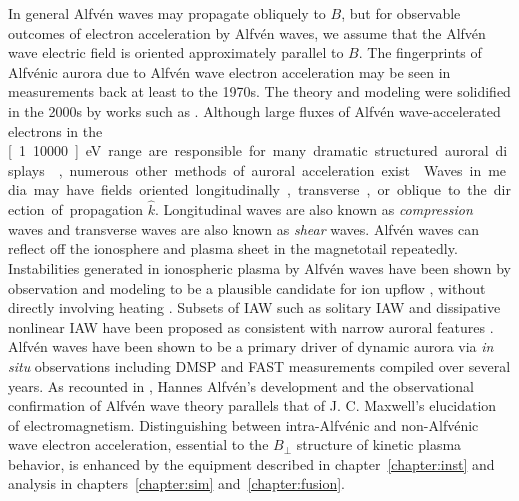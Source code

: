 In general Alfvén waves may propagate obliquely to $B$, but for observable outcomes of electron acceleration by Alfvén waves, we assume that the Alfvén wave electric field is oriented approximately parallel to $B$.
The fingerprints of Alfvénic aurora due to Alfvén wave electron acceleration may be seen in measurements back at least to the 1970s.
The theory and modeling were solidified in the 2000s by works such as \citet{stasiewicz2000,chaston2003,chaston2007how}.
Although large fluxes of Alfvén wave-accelerated electrons in the \unit[1..10000]{eV} range are responsible for many dramatic structured auroral displays \citep{chaston2003}, numerous other methods of auroral acceleration exist \citep{borovsky1993}.

Waves in media may have fields oriented longitudinally, transverse, or oblique to the direction of propagation $\hat{k}$. 
Longitudinal waves are also known as \textit{compression} waves and transverse waves are also known as \textit{shear} waves.
Alfvén waves can reflect off the ionosphere and plasma sheet in the magnetotail repeatedly. 
Instabilities generated in ionospheric plasma by Alfvén waves have been shown by observation and modeling to be a plausible candidate for ion upflow \citep{chaston2004}, without directly involving heating \citep{zett2007,zett2008}.
Subsets of IAW such as solitary IAW and dissipative nonlinear IAW have been proposed as consistent with narrow auroral features \citep{wu2004}.
Alfvén waves have been shown to be a primary driver of dynamic aurora via \textit{in situ} observations including DMSP and FAST measurements compiled over several years.
As recounted in \citet{stasiewicz2000}, Hannes Alfvén's development and the observational confirmation of Alfvén wave theory parallels that of J. C. Maxwell's elucidation of electromagnetism.
Distinguishing between intra-Alfvénic and non-Alfvénic wave electron acceleration, essential to the $B_\perp$ structure of kinetic plasma behavior, is enhanced by the equipment described in chapter~\ref{chapter:inst} and analysis in chapters~\ref{chapter:sim} and~\ref{chapter:fusion}.

